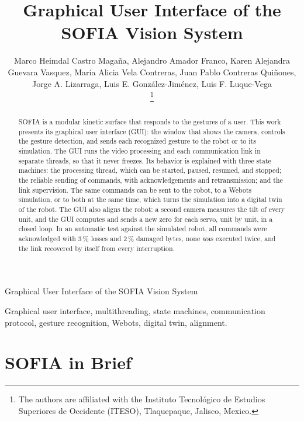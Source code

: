 \documentclass[lettersize,journal]{IEEEtran}
\begin{document}
	\title{Graphical User Interface of the SOFIA Vision System}

	\author{
		Marco Heimdal Castro Magaña, Alejandro Amador Franco, Karen Alejandra Guevara Vasquez, María Alicia Vela Contreras, Juan Pablo Contreras Quiñones,
		Jorge A. Lizarraga, Luis E. González-Jiménez, Luis F. Luque-Vega

		\thanks{The authors are affiliated with the Instituto Tecnológico de Estudios Superiores de Occidente (ITESO), Tlaquepaque, Jalisco, Mexico.}
	}

	{Graphical User Interface of the SOFIA Vision System}

	\maketitle

	\begin{abstract}
		SOFIA is a modular kinetic surface that responds to the gestures of a user. This work presents its graphical user interface (GUI): the window that shows the camera, controls the gesture detection, and sends each recognized gesture to the robot or to its simulation. The GUI runs the video processing and each communication link in separate threads, so that it never freezes. Its behavior is explained with three state machines: the processing thread, which can be started, paused, resumed, and stopped; the reliable sending of commands, with acknowledgements and retransmission; and the link supervision. The same commands can be sent to the robot, to a Webots simulation, or to both at the same time, which turns the simulation into a digital twin of the robot. The GUI also aligns the robot: a second camera measures the tilt of every unit, and the GUI computes and sends a new zero for each servo, unit by unit, in a closed loop. In an automatic test against the simulated robot, all commands were acknowledged with 3\,\% losses and 2\,\% damaged bytes, none was executed twice, and the link recovered by itself from every interruption.
 \end{abstract}

	\begin{IEEEkeywords}
		Graphical user interface, multithreading, state machines, communication protocol, gesture recognition, Webots, digital twin, alignment.
	\end{IEEEkeywords}


	\section{SOFIA in Brief}
\end{document}

